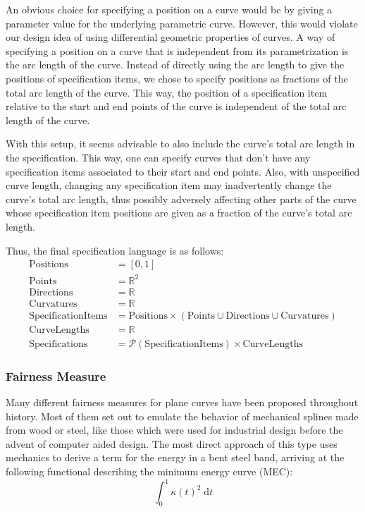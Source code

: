 \documentclass[a4paper]{article}
\newcommand{\apply}[2]{#1\!\left(#2\right)}
\begin{document}
				An obvious choice for specifying a position on a curve would be by giving a parameter value for the underlying parametric curve. However, this would violate our design idea of using differential geometric properties of curves. A way of specifying a position on a curve that is independent from its parametrization is the arc length of the curve. Instead of directly using the arc length to give the positions of specification items, we chose to specify positions as fractions of the total arc length of the curve. This way, the position of a specification item relative to the start and end points of the curve is independent of the total arc length of the curve.

				With this setup, it seems advisable to also include the curve's total arc length in the specification. This way, one can specify curves that don't have any specification items associated to their start and end points. Also, with unspecified curve length, changing any specification item may inadvertently change the curve's total arc length, thus possibly adversely affecting other parts of the curve whose specification item positions are given as a fraction of the curve's total arc length.

				Thus, the final specification language is as follows:
				\begin{align*}
					\text{Positions} & = \left[0, 1\right]\\
					\text{Points} & = \mathbb{R}^2\\
					\text{Directions} & = \mathbb{R}\\
					\text{Curvatures} & = \mathbb{R}\\
					\text{SpecificationItems} & = \text{Positions} \times \left(\text{Points} \cup \text{Directions} \cup \text{Curvatures}\right)\\
					\text{CurveLengths} & = \mathbb{R}\\
					\text{Specifications} & = \mathcal{P}\left(\text{SpecificationItems}\right) \times \text{CurveLengths}
				\end{align*}

			\subsubsection{Fairness Measure}
			\label{section:fairness_measure}


				Many different fairness measures for plane curves have been proposed throughout history. Most of them set out to emulate the behavior of mechanical splines made from wood or steel, like those which were used for industrial design before the advent of computer aided design. The most direct approach of this type uses mechanics to derive a term for the energy in a bent steel band, arriving at the following functional describing the minimum energy curve (MEC):
				\begin{displaymath}
					\int_{0}^{1}\apply{\kappa}{t}^2\;\mathrm{d}t
				\end{displaymath}
\end{document}
